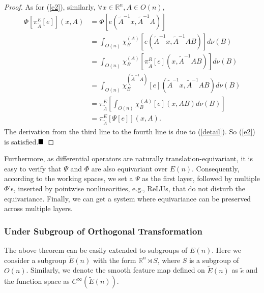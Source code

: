 \documentclass{article}
\newtheorem{proof}{Proof}
\begin{document}
\begin{proof}
	As for (\ref{e2}), similarly, $\forall x\in \mathbb{R}^n,A\in O(n)$,
	\begin{align*}
	\Phi \left[\pi^{E}_{\widetilde{A}}[e]\right](x,A) &= \Phi \left[e(\widetilde{A}^{-1}x,\widetilde{A}^{-1}A)\right] \\
	&= \int_{O(n)} \chi_B^{(A)} \left[e(\widetilde{A}^{-1}x,\widetilde{A}^{-1}AB)\right]d\nu (B)\\
	&= \int_{O(n)} \chi_B^{(A)} \left[\pi^{R}_{\widetilde{A}} [e](x,\widetilde{A}^{-1}AB)\right]d\nu (B)\\
	&= \int_{O(n)} \chi_B^{(\widetilde A^{-1}A)} [e](\widetilde A^{-1}x,\widetilde{A}^{-1}AB)  d\nu (B)\\
	& = \pi^{E}_{\widetilde A} \left[\int_{O(n)} \chi_B^{(A)}  [e](x,AB)d\nu(B)\right]\\
	& = \pi^{E}_{\widetilde{A}} [\Psi [e]] (x,A).
	\end{align*}
	The derivation from the third line to the fourth line is due to (\ref{detail}). So (\ref{e2}) is satisfied.$\hfill\blacksquare$  
\end{proof}

Furthermore, as differential operators are naturally translation-equivariant, it is easy to verify that $\Psi$ and $\Phi$ are also equivariant over $E(n)$. Consequently, according to the working spaces, we set a $\Psi$ as the first layer,
followed by multiple $\Phi$'s, inserted by pointwise nonlinearities, e.g., ReLUs, that do not disturb the equivariance. Finally, we can get a system where equivariance can be preserved across multiple layers.

\subsubsection{Under Subgroup of Orthogonal Transformation \label{subgroup}}
The above theorem can be easily extended to subgroups of $E(n)$. Here we consider a subgroup $\tilde{E}(n)$ with the form $\mathbb{R}^n \rtimes S$, where $S$ is a subgroup of $O(n)$. 
Similarly, we denote the smooth feature map defined on $\tilde{E}(n)$ as $\tilde{e}$ and the function space as $C^{\infty}(\tilde{E}(n))$.
\end{document}
